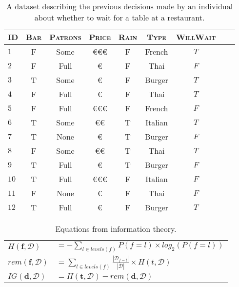 \documentclass[solution]{ditpaper}
\begin{document}
\begin{table}[h]
\begin{center}
\begin{tabular}{lcccccccc}
\hline
\textsc{ID} & \textsc{Bar} & \textsc{Patrons} & \textsc{Price} & \textsc{Rain} & \textsc{Type} & \textsc{WillWait} \\
\hline
$1$  & F & Some & \euro\euro\euro & F & French &  $T$\\
$2$    & F & Full & \euro & F & Thai &  $F$\\
$3$    & T & Some & \euro & F & Burger &  $T$\\
$4$    & F & Full & \euro & F & Thai  &  $T$\\
$5$    & F & Full & \euro\euro\euro & F & French &  $F$\\
$6$    & T & Some & \euro\euro & T & Italian &  $T$\\
$7$    & T & None & \euro & T & Burger &  $F$\\
$8$    & F & Some & \euro\euro & T & Thai &  $T$\\
$9$     & T & Full & \euro & T & Burger &  $F$\\
$10$ & T & Full & \euro\euro\euro & F & Italian &  $F$\\
$11$ & F & None & \euro & F & Thai &  $F$\\
$12$ & T & Full & \euro & F & Burger &  $T$\\
\hline
\end{tabular}
\end{center}
\label{tab:rest}
\caption{A dataset describing the previous decisions made by an individual about whether to wait for a table at a restaurant.}
\end{table}

	\begin{table}[!hb]
			\renewcommand{\arraystretch}{2}
	\begin{center}
	\caption{Equations from information theory.}
	\label{tab:info-eqs}
		\begin{tabular}{ll}
	\hline
	$H(\mathbf{f}, \mathcal{D})$ & $= -\displaystyle\sum_{l \in levels(f)} P(f=l) \times log_2(P(f=l))$\\
	$rem(\mathbf{f}, \mathcal{D})$ & $=\displaystyle\sum_{l \in levels(f)} \frac{|\mathcal{D}_{f=l}|}{|\mathcal{D}|} \times H(t, \mathcal{D})$\\
	$IG(\mathbf{d},\mathcal{D})$ & $=H(\mathbf{t}, \mathcal{D})-rem(\mathbf{d}, \mathcal{D})$\\
	\hline
	\end{tabular}
	\end{center}
	\end{table}		
\end{document}

